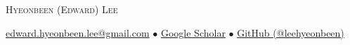 \documentclass[a4paper,10pt]{extarticle}
\begin{document}
\renewcommand*{\arraystretch}{1.5}

\pagestyle{empty}

\begin{center}
	{\huge \textsc{Hyeonbeen (Edward) Lee}}
\end{center}

\begin{center}
	\href{mailto:edward.hyeonbeen.lee@gmail.com}{edward.hyeonbeen.lee@gmail.com} $\bullet$ \href{https://scholar.google.com/citations?user=TiduRxoAAAAJ}{Google Scholar} $\bullet$ \href{https://github.com/leehyeonbeen}{GitHub (@leehyeonbeen)}
\end{center}

\end{document}
